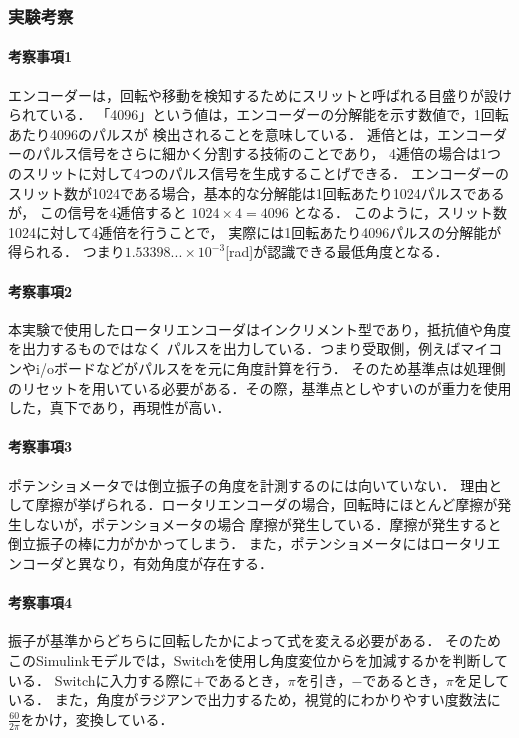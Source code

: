 \subsubsection{実験考察}
\paragraph{考察事項1}
エンコーダーは，回転や移動を検知するためにスリットと呼ばれる目盛りが設けられている．
「4096」という値は，エンコーダーの分解能を示す数値で，1回転あたり4096のパルスが
検出されることを意味している．
逓倍とは，エンコーダーのパルス信号をさらに細かく分割する技術のことであり，
4逓倍の場合は1つのスリットに対して4つのパルス信号を生成することげできる．
エンコーダーのスリット数が1024である場合，基本的な分解能は1回転あたり1024パルスであるが，
この信号を4逓倍すると
\( 1024\times 4=4096 \) となる．
このように，スリット数1024に対して4逓倍を行うことで，
実際には1回転あたり4096パルスの分解能が得られる．
つまり\( 1.53398...\times10^{-3} \)[rad]が認識できる最低角度となる．

\paragraph{考察事項2}
本実験で使用したロータリエンコーダはインクリメント型であり，抵抗値や角度を出力するものではなく
パルスを出力している．つまり受取側，例えばマイコンやi/oボードなどがパルスをを元に角度計算を行う．
そのため基準点は処理側のリセットを用いている必要がある．その際，基準点としやすいのが重力を使用した，真下であり，再現性が高い．

\paragraph{考察事項3}
ポテンショメータでは倒立振子の角度を計測するのには向いていない．
理由として摩擦が挙げられる．ロータリエンコーダの場合，回転時にほとんど摩擦が発生しないが，ポテンショメータの場合
摩擦が発生している．摩擦が発生すると倒立振子の棒に力がかかってしまう．
また，ポテンショメータにはロータリエンコーダと異なり，有効角度が存在する．

\paragraph{考察事項4}
振子が基準からどちらに回転したかによって式を変える必要がある．
そのためこのSimulinkモデルでは，Switchを使用し角度変位からを加減するかを判断している．
Switchに入力する際に\( + \)であるとき，\( \pi \)を引き，\( - \)であるとき，\( \pi \)を足している．
また，角度がラジアンで出力するため，視覚的にわかりやすい度数法に\( \frac{60}{2\pi}\)をかけ，変換している．

